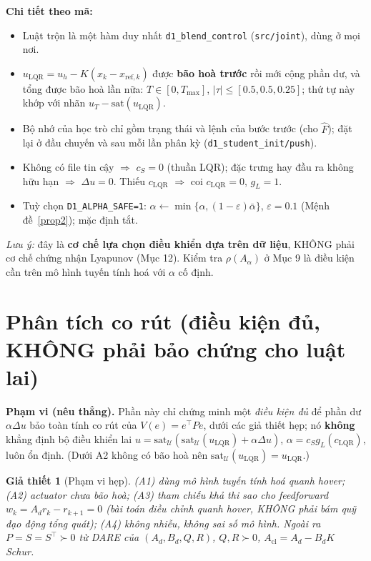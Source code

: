 \documentclass[11pt]{article}
\newtheorem{assumption}{Giả thiết}
\newcommand{\T}{^{\!\top}}
\newcommand{\cS}{c_{S}}
\newcommand{\cL}{c_{\mathrm{LQR}}}
\newcommand{\uL}{u_{\mathrm{LQR}}}
\newcommand{\Acl}{A_{\mathrm{cl}}}
\begin{document}
\textbf{Chi tiết theo mã:}
\begin{itemize}[leftmargin=1.4em,itemsep=1pt]
\item Luật trộn là một hàm duy nhất \texttt{d1\_blend\_control} (\texttt{src/joint}), dùng ở mọi nơi.
\item $\uL=u_h-K(x_k-x_{\mathrm{ref},k})$ được \textbf{bão hoà trước} rồi mới cộng phần dư, và tổng được bão
hoà lần nữa: $T\in[0,T_{\max}]$, $|\tau|\le[0.5,0.5,0.25]$; thứ tự này khớp với nhãn $u_T-\mathrm{sat}(\uL)$.
\item Bộ nhớ của học trò chỉ gồm trạng thái và lệnh của bước trước (cho $\hat F$); đặt lại ở đầu chuyến và sau
mỗi lần phân kỳ (\texttt{d1\_student\_init/push}).
\item Không có file tin cậy $\Rightarrow$ $\cS=0$ (thuần LQR); đặc trưng hay đầu ra không hữu hạn $\Rightarrow$
$\Delta u=0$. Thiếu $\cL$ $\Rightarrow$ coi $\cL=0$, $g_L=1$.
\item Tuỳ chọn \texttt{D1\_ALPHA\_SAFE=1}: $\alpha\leftarrow\min\{\alpha,(1-\varepsilon)\bar\alpha\}$,
$\varepsilon=0.1$ (Mệnh đề~\ref{prop2}); mặc định tắt.
\end{itemize}

\noindent\emph{Lưu ý:} đây là \textbf{cơ chế lựa chọn điều khiển dựa trên dữ liệu}, KHÔNG phải cơ chế
chứng nhận Lyapunov (Mục 12). Kiểm tra $\rho(A_\alpha)$ ở Mục 9 là điều kiện cần trên mô hình tuyến tính hoá
với $\alpha$ cố định.

\section{Phân tích co rút (điều kiện đủ, KHÔNG phải bảo chứng cho luật lai)}
\textbf{Phạm vi (nêu thẳng).} Phần này chỉ chứng minh một \emph{điều kiện đủ} để phần dư $\alpha\Delta u$
bảo toàn tính co rút của $V(e)=e\T P e$, dưới các giả thiết hẹp; nó \textbf{không} khẳng định bộ điều khiển
lai $u=\mathrm{sat}_{\mathcal U}(\mathrm{sat}_{\mathcal U}(\uL)+\alpha\Delta u)$, $\alpha=\cS g_L(\cL)$, luôn ổn
định. (Dưới A2 không có bão hoà nên $\mathrm{sat}_{\mathcal U}(\uL)=\uL$.)

\begin{assumption}[Phạm vi hẹp]\label{as}
(A1) dùng mô hình \emph{tuyến tính hoá} quanh hover; (A2) actuator \emph{chưa bão hoà}; (A3) tham chiếu
\emph{khả thi} sao cho feedforward $w_k=A_d r_k-r_{k+1}=0$ (bài toán \emph{điều chỉnh} quanh hover, KHÔNG
phải bám quỹ đạo động tổng quát); (A4) \emph{không nhiễu, không sai số mô hình}. Ngoài ra
$P=S=S\T\succ0$ từ DARE của $(A_d,B_d,Q,R)$, $Q,R\succ0$, $\Acl=A_d-B_dK$ Schur.
\end{assumption}
\end{document}
